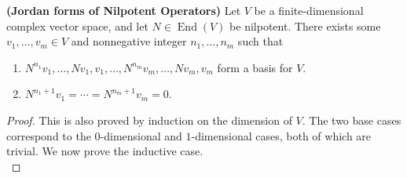\documentclass{report}
\begin{document}
\begin{theorem}
\label{JfNO}
\textbf{(Jordan forms of Nilpotent Operators)} Let $V$ be a finite-dimensional complex vector space, and let  $N \in \operatorname{End}(V)$ be nilpotent. There exists some $v_1,\dots ,v_m \in V$ and nonnegative integer $n_1,\dots ,n_m$ such that 
\begin{enumerate}[label=(\alph*)]
  \item $N^{n_1}v_1,\dots ,Nv_1,v_1,\dots ,N^{n_m}v_m,\dots ,Nv_m,v_m$ form a basis for $V$. 
  \item $N^{n_1+1}v_1=\cdots = N^{n_m+1}v_m=0$. 
\end{enumerate}
\end{theorem}
\begin{proof}
This is also proved by induction on the dimension of $V$. The two base cases correspond to the $0$-dimensional and $1$-dimensional cases, both of which are trivial. We now prove the inductive case. \\


\end{proof}
\end{document}

